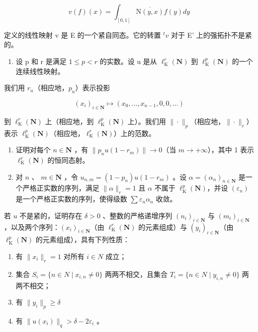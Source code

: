 \[
v (f) (x) = \int_ {[ 0, 1 ]} \overline {{\mathrm{N} (y , x)}} f (y) d y
\]

定义的线性映射 v 是 E 的一个紧自同态。它的转置 \(^{t}v\) 对于 E' 上的强拓扑不是紧的。

\begin{enumerate}
\def\labelenumi{\arabic{enumi})}
\setcounter{enumi}{9}
\tightlist
\item
  设 p 和 r 是满足 \(1 \leqslant p < r\) 的实数。设 u 是从 \(\ell_{\mathrm{K}}^{r}(\mathbf{N})\) 到 \(\ell_{\mathrm{K}}^{p}(\mathbf{N})\) 的一个连续线性映射。
\end{enumerate}

我们用 \(r_{n}\)（相应地，\(p_{n}\)）表示投影

\[
(x _ {i}) _ {i \in \mathbf {N}} \mapsto (x _ {0}, \ldots , x _ {n - 1}, 0, 0, \ldots)
\]

到 \(\ell_{\mathrm{K}}^{r}(\mathbf{N})\) 上（相应地，到 \(\ell_{\mathrm{K}}^{p}(\mathbf{N})\) 上）。我们用 \(\| \cdot \| _p\)（相应地，\(\| \cdot \| _r\)）表示 \(\ell_{\mathrm{K}}^{p}(\mathbf{N})\)（相应地，\(\ell_{\mathrm{K}}^{r}(\mathbf{N})\)）上的范数。

\begin{enumerate}
\def\labelenumi{\alph{enumi})}
\item
  证明对每个 \(n \in \mathbf{N}\) ，有 \(\|p_n u(1 - r_m)\| \to 0\)（当 \(m \to +\infty\)），其中 1 表示 \(\ell_{\mathrm{K}}^{r}(\mathbf{N})\) 的恒同态射。
\item
  对 \(n\) 、 \(m \in \mathbf{N}\) ，令 \(u_{n,m} = (1 - p_n)u(1 - r_m)\) 。设 \(\alpha = (\alpha_n)_{n \in \mathbf{N}}\) 是一个严格正实数的序列，满足 \(\|\alpha\|_r = 1\) 且 \(\alpha\) 不属于 \(\ell_{\mathrm{K}}^p(\mathbf{N})\)，并设 \((\varepsilon_n)\) 是一个严格正实数的序列，使得级数 \(\sum \varepsilon_n\alpha_n\) 收敛。
\end{enumerate}

若 \(u\) 不是紧的，证明存在 \(\delta > 0\) 、整数的严格递增序列 \((n_i)_{i \in \mathbf{N}}\) 与 \((m_i)_{i \in \mathbf{N}}\)，以及两个序列：\((x_i)_{i \in \mathbf{N}}\)（由 \(\ell_{\mathrm{K}}^r(\mathbf{N})\) 的元素组成）与 \((y_i)_{i \in \mathbf{N}}\)（由 \(\ell_{\mathrm{K}}^p(\mathbf{N})\) 的元素组成），具有下列性质：

\begin{enumerate}
\def\labelenumi{(\roman{enumi})}
\item
  有 \(\|x_{i}\|_{r}=1\) 对所有 \(i\in N\) 成立；
\item
  集合 \(S_{i} = \{n \in N \mid x_{i,n} \neq 0\}\) 两两不相交，且集合 \(T_{i} = \{n \in N \mid y_{i,n} \neq 0\}\) 两两不相交；
\item
  有 \(\| y_i\| _p\geqslant \delta\)
\item
  有 \(\|u(x_{i})\|_{q} > \delta - 2\varepsilon_{i}\) 。
\end{enumerate}


